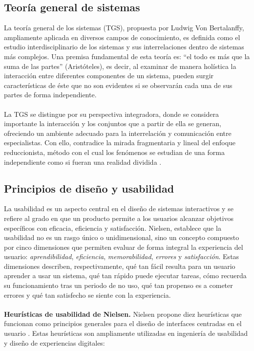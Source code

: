 \subsection{Teoría general de sistemas}

La teoría general de los sistemas (TGS), propuesta por Ludwig Von Bertalanffy, ampliamente aplicada en diversos campos de conocimiento, es definida como el estudio interdisciplinario de los sistemas y sus interrelaciones dentro de sistemas más complejos. Una premisa fundamental de esta teoría es: “el todo es más que la suma de las partes” (Aristóteles), es decir, al examinar de manera holística la interacción entre diferentes componentes de un sistema, pueden surgir características de éste que no son evidentes si se observarán cada una de sus partes de forma independiente.
\\
\\
La TGS se distingue por su perspectiva integradora, donde se considera importante la interacción y los conjuntos que a partir de ella se generan, ofreciendo un ambiente adecuado para la interrelación y comunicación entre especialistas. Con ello, contradice la mirada fragmentaria y lineal del enfoque reduccionista, método con el cual los fenómenos se estudian de una forma independiente como si fueran una realidad dividida \cite{GutierrezGomez2013}.

\subsection{Principios de diseño y usabilidad}

La usabilidad es un aspecto central en el diseño de sistemas interactivos y se refiere al grado en que un producto permite a los usuarios alcanzar objetivos específicos con eficacia, eficiencia y satisfacción. Nielsen, establece que la usabilidad no es un rasgo único o unidimensional, sino un concepto compuesto por cinco dimensiones que permiten evaluar de forma integral la experiencia del usuario: \textit{aprendibilidad}, \textit{eficiencia}, \textit{memorabilidad}, \textit{errores} y \textit{satisfacción}. Estas dimensiones describen, respectivamente, qué tan fácil resulta para un usuario aprender a usar un sistema, qué tan rápido puede ejecutar tareas, cómo recuerda su funcionamiento tras un periodo de no uso, qué tan propenso es a cometer errores y qué tan satisfecho se siente con la experiencia.
\\
\\
\textbf{Heurísticas de usabilidad de Nielsen.}  
Nielsen propone diez heurísticas que funcionan como principios generales para el diseño de interfaces centradas en el usuario \cite{NielsenMolich1990}. Estas heurísticas son ampliamente utilizadas en ingeniería de usabilidad y diseño de experiencias digitales:

